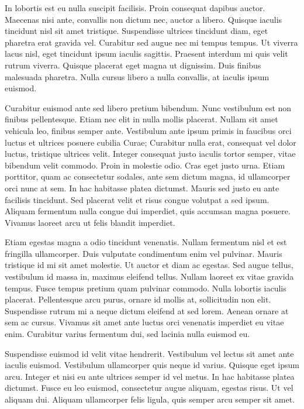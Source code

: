 In lobortis est eu nulla suscipit facilisis. Proin consequat dapibus auctor. Maecenas nisi ante, convallis non dictum nec, auctor a libero. Quisque iaculis tincidunt nisl sit amet tristique. Suspendisse ultrices tincidunt diam, eget pharetra erat gravida vel. Curabitur sed augue nec mi tempus tempus. Ut viverra lacus nisl, eget tincidunt ipsum iaculis sagittis. Praesent interdum mi quis velit rutrum viverra. Quisque placerat eget magna ut dignissim. Duis finibus malesuada pharetra. Nulla cursus libero a nulla convallis, at iaculis ipsum euismod.

Curabitur euismod ante sed libero pretium bibendum. Nunc vestibulum est non finibus pellentesque. Etiam nec elit in nulla mollis placerat. Nullam sit amet vehicula leo, finibus semper ante. Vestibulum ante ipsum primis in faucibus orci luctus et ultrices posuere cubilia Curae; Curabitur nulla erat, consequat vel dolor luctus, tristique ultrices velit. Integer consequat justo iaculis tortor semper, vitae bibendum velit commodo. Proin in molestie odio. Cras eget justo urna. Etiam porttitor, quam ac consectetur sodales, ante sem dictum magna, id ullamcorper orci nunc at sem. In hac habitasse platea dictumst. Mauris sed justo eu ante facilisis tincidunt. Sed placerat velit et risus congue volutpat a sed ipsum. Aliquam fermentum nulla congue dui imperdiet, quis accumsan magna posuere. Vivamus laoreet arcu ut felis blandit imperdiet.

Etiam egestas magna a odio tincidunt venenatis. Nullam fermentum nisl et est fringilla ullamcorper. Duis vulputate condimentum enim vel pulvinar. Mauris tristique id mi sit amet molestie. Ut auctor et diam ac egestas. Sed augue tellus, vestibulum id massa in, maximus eleifend tellus. Nullam laoreet ex vitae gravida tempus. Fusce tempus pretium quam pulvinar commodo. Nulla lobortis iaculis placerat. Pellentesque arcu purus, ornare id mollis at, sollicitudin non elit. Suspendisse rutrum mi a neque dictum eleifend at sed lorem. Aenean ornare at sem ac cursus. Vivamus sit amet ante luctus orci venenatis imperdiet eu vitae enim. Curabitur varius fermentum dui, sed lacinia nulla euismod eu.

Suspendisse euismod id velit vitae hendrerit. Vestibulum vel lectus sit amet ante iaculis euismod. Vestibulum ullamcorper quis neque id varius. Quisque eget ipsum arcu. Integer et nisi eu ante ultrices semper id vel metus. In hac habitasse platea dictumst. Fusce eu leo euismod, consectetur augue aliquam, egestas risus. Ut vel aliquam dui. Aliquam ullamcorper felis ligula, quis semper arcu semper sit amet.

